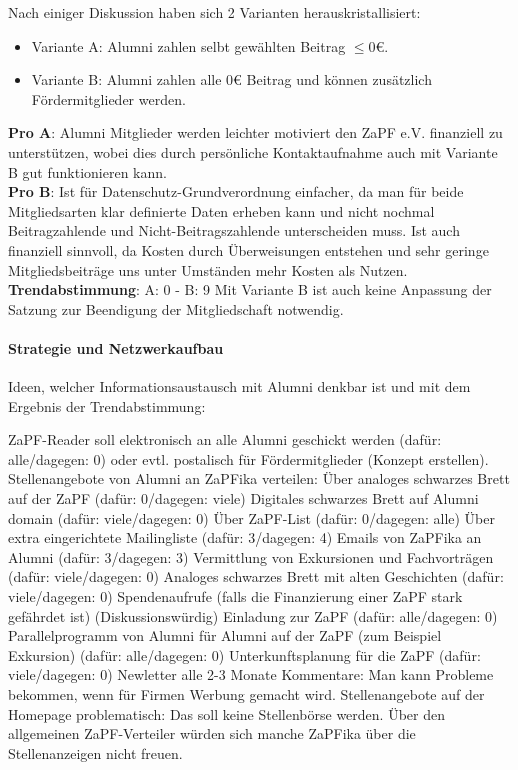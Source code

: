       Nach einiger Diskussion haben sich 2 Varianten herauskristallisiert:
      \begin{itemize}
        \item Variante A: Alumni zahlen selbt gewählten Beitrag $\leq 0 \euro$.
        \item Variante B: Alumni zahlen alle $0 \euro$ Beitrag und können zusätzlich Fördermitglieder werden.
      \end{itemize}
      \textbf{Pro A}: Alumni Mitglieder werden leichter motiviert den ZaPF e.V. finanziell zu unterstützen, wobei dies durch persönliche Kontaktaufnahme auch mit Variante B gut funktionieren kann. \\
      \textbf{Pro B}: Ist für Datenschutz-Grundverordnung einfacher, da man für beide Mitgliedsarten klar definierte Daten erheben kann und nicht nochmal Beitragzahlende und Nicht-Beitragszahlende unterscheiden muss. Ist auch finanziell sinnvoll, da Kosten durch Überweisungen entstehen und sehr geringe Mitgliedsbeiträge uns unter Umständen mehr Kosten als Nutzen. \\

      \textbf{Trendabstimmung}: A: 0 -  B: 9
      Mit Variante B ist auch keine Anpassung der Satzung zur Beendigung der Mitgliedschaft
notwendig.

      \paragraph{Strategie und Netzwerkaufbau}
        Ideen, welcher Informationsaustausch mit Alumni denkbar ist und mit dem Ergebnis der Trendabstimmung:
        \begin{outline}
          \1 ZaPF-Reader soll elektronisch an alle Alumni geschickt werden (dafür: alle/dagegen: 0) oder evtl. postalisch für Fördermitglieder (Konzept erstellen).
          \1 Stellenangebote von Alumni an ZaPFika verteilen:
            \2 Über analoges schwarzes Brett auf der ZaPF (dafür: 0/dagegen: viele)
            \2 Digitales schwarzes Brett auf Alumni domain (dafür: viele/dagegen: 0)
            \2 Über ZaPF-List (dafür: 0/dagegen: alle)
            \2 Über extra eingerichtete Mailingliste (dafür: 3/dagegen: 4)
            \2 Emails von ZaPFika an Alumni (dafür: 3/dagegen: 3)
          \1 Vermittlung von Exkursionen und Fachvorträgen (dafür: viele/dagegen: 0)
          \1 Analoges schwarzes Brett mit alten Geschichten (dafür: viele/dagegen: 0)
          \1 Spendenaufrufe (falls die Finanzierung einer ZaPF stark gefährdet ist) (Diskussionswürdig)
          \1 Einladung zur ZaPF (dafür: alle/dagegen: 0)
          \1 Parallelprogramm von Alumni für Alumni auf der ZaPF (zum Beispiel Exkursion) (dafür: alle/dagegen: 0)
          \1 Unterkunftsplanung für die ZaPF (dafür: viele/dagegen: 0)
          \1 Newletter alle 2-3 Monate
          \1 Kommentare: Man kann Probleme bekommen, wenn für Firmen Werbung gemacht wird. Stellenangebote auf der Homepage problematisch: Das soll keine Stellenbörse werden. Über den allgemeinen ZaPF-Verteiler würden sich manche ZaPFika über die Stellenanzeigen nicht freuen.
        \end{outline}


